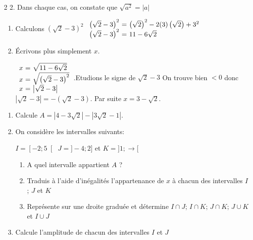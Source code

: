 \begin{multicols*}{2}
  	2. Dans chaque cas, on constate que $\sqrt{a^2}=\left| a \right |$
  	
  	\resul
  	\begin{enumerate}
  		
  		\item  Calculons  $\left( \sqrt{2}-3 \right)^2 $
  		$\begin{array}{r@{\ =\ }l}
  			\left( \sqrt{2}-3 \right)^2
  			& \left( \sqrt{2} \right)^{2}-2(3)\left( \sqrt{2} \right)+3^2 \\
  			\left( \sqrt{2}-3 \right)^2	&11-6\sqrt{2} \\
  		\end{array}$
  		
  		\item  Écrivons plus simplement $x$.
  		
  		$\begin{array}{r@{\ =\ }l}
  			x& \sqrt{11-6\sqrt{2}}	\\
  			x& \sqrt{\left( \sqrt{2}-3 \right)^2}  \\ 
  			x& \left| \sqrt{2}-3  \right | \\
  		\end{array}$.Etudions le signe de $  \sqrt{2}-3 $
  		On trouve bien $<0$ donc $ \left| \sqrt{2}-3 \right |=-(\sqrt{2}-3 )$. Par suite $x=3- \sqrt{2}$.
  	\end{enumerate}
  	\reto
  	\begin{center}
  	\end{center}
  	\begin{center}
  	\end{center}
  	\begin{enumerate}
  		\item Calcule $A=\left|4-3\sqrt{2} \right |-\left|3\sqrt{2}-1 \right |$.
  		\item On considère les intervalles suivants:
  		
  		$I=\left[-2;5\right[$  $J=]-4;2]$	 et $K=]1;\rightarrow[$
  		\begin{enumerate}
  			\item  A quel intervalle appartient $A$ ?
  			\item   Traduis à l'aide  d'inégalités l'appartenance de $x$ à chacun des intervalles $I$; $J$ et $K$
  			\item  Représente sur une  droite graduée et détermine $I\cap J$;  $I\cap K$; $J\cap K$; $J\cup K$ et $I\cup J$
  		\end{enumerate} 
  		\item Calcule l'amplitude de chacun des intervalles $I$ et  $J$
  	\end{enumerate} 
  	

\end{multicols*}
